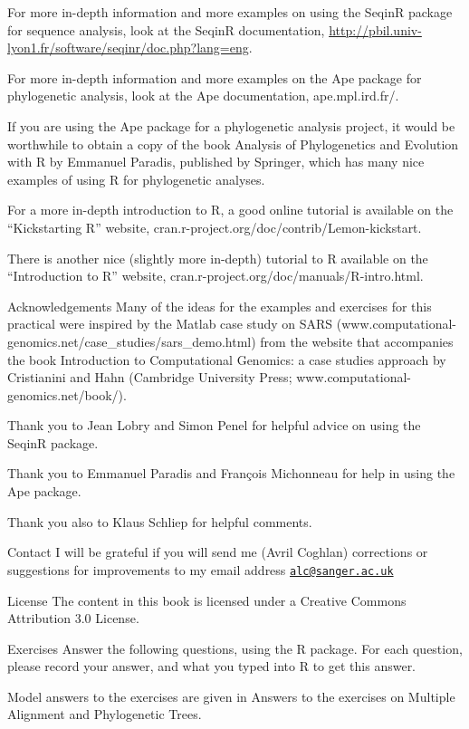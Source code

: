 \documentclass[
]{book}
\begin{document}
For more in-depth information and more examples on using the SeqinR package for sequence analysis, look at the SeqinR documentation, \url{http://pbil.univ-lyon1.fr/software/seqinr/doc.php?lang=eng}.

For more in-depth information and more examples on the Ape package for phylogenetic analysis, look at the Ape documentation, ape.mpl.ird.fr/.

If you are using the Ape package for a phylogenetic analysis project, it would be worthwhile to obtain a copy of the book Analysis of Phylogenetics and Evolution with R by Emmanuel Paradis, published by Springer, which has many nice examples of using R for phylogenetic analyses.

For a more in-depth introduction to R, a good online tutorial is available on the ``Kickstarting R'' website, cran.r-project.org/doc/contrib/Lemon-kickstart.

There is another nice (slightly more in-depth) tutorial to R available on the ``Introduction to R'' website, cran.r-project.org/doc/manuals/R-intro.html.

Acknowledgements
Many of the ideas for the examples and exercises for this practical were inspired by the Matlab case study on SARS (www.computational-genomics.net/case\_studies/sars\_demo.html) from the website that accompanies the book Introduction to Computational Genomics: a case studies approach by Cristianini and Hahn (Cambridge University Press; www.computational-genomics.net/book/).

Thank you to Jean Lobry and Simon Penel for helpful advice on using the SeqinR package.

Thank you to Emmanuel Paradis and François Michonneau for help in using the Ape package.

Thank you also to Klaus Schliep for helpful comments.

Contact
I will be grateful if you will send me (Avril Coghlan) corrections or suggestions for improvements to my email address \href{mailto:alc@sanger.ac.uk}{\nolinkurl{alc@sanger.ac.uk}}

License
The content in this book is licensed under a Creative Commons Attribution 3.0 License.

Exercises
Answer the following questions, using the R package. For each question, please record your answer, and what you typed into R to get this answer.

Model answers to the exercises are given in Answers to the exercises on Multiple Alignment and Phylogenetic Trees.
\end{document}
